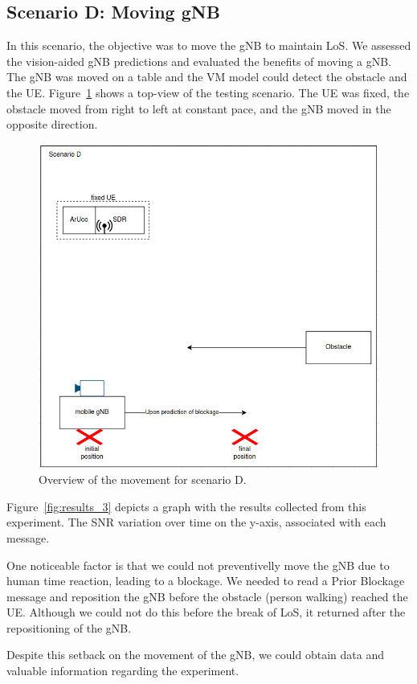 \subsection{Scenario D: Moving gNB}\label{subsec:scenario-3:-moving-gnb}

In this scenario, the objective was to move the gNB to maintain LoS\@.
We assessed the vision-aided gNB predictions and evaluated the benefits of moving a gNB\@.
The gNB was moved on a table and the VM model could detect the obstacle and the UE\@.
Figure~\ref{fig:test_movgnb} shows a top-view of the testing scenario.
The UE was fixed, the obstacle moved from right to left at constant pace, and the gNB moved in the opposite direction.

\begin{figure}[H]
    \centering
    \includegraphics[width=0.5\linewidth]{figures/scenario3}
    \caption{Overview of the movement for scenario D.}
    \label{fig:test_movgnb}
\end{figure}

Figure~\ref{fig:results_3} depicts a graph with the results collected from this experiment.
The SNR variation over time on the y-axis, associated with each message.

One noticeable factor is that we could not preventivelly move the gNB due to human time reaction, leading to a blockage.
We needed to read a Prior Blockage message and reposition the gNB before the obstacle (person walking) reached the UE\@.
Although we could not do this before the break of LoS, it returned after the repositioning of the gNB\@.

Despite this setback on the movement of the gNB, we could obtain data and valuable information regarding the experiment.

